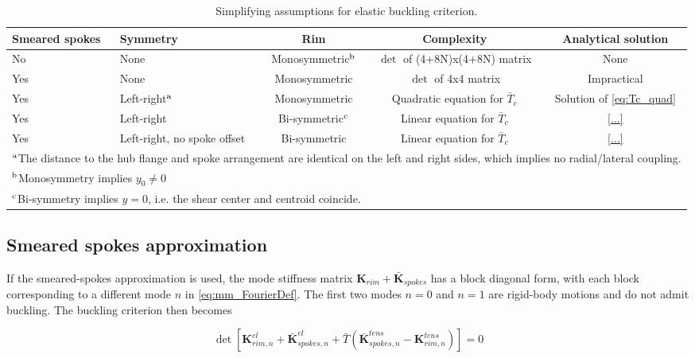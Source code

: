 \documentclass[\rootdir/thesis.tex]{subfiles}
\begin{document}
\begin{table}[h]
\caption{Simplifying assumptions for elastic buckling criterion.}
\label{tab:BucklingSolutions}
\begin{tabularx}{\textwidth}{p{1.2cm}Xccc}
\toprule
\centering Smeared spokes & \centering Symmetry & Rim & Complexity & Analytical solution\\
\midrule
\centering No  & \centering None & Monosymmetric$^{\rm b}$ & $\det$ of (4+8N)x(4+8N) matrix & None\\
\centering Yes & \centering None & Monosymmetric & $\det$ of 4x4 matrix & Impractical\\
\centering Yes & \centering Left-right$^{\rm a}$& Monosymmetric& Quadratic equation for $\bar{T}_c$ & Solution of \eqref{eq:Tc_quad}\\
\centering Yes & \centering Left-right& Bi-symmetric$^{\rm c}$ & Linear equation for $\bar{T}_c$ & \eqref{...}\\
\centering Yes & \centering Left-right, no spoke offset & Bi-symmetric & Linear equation for $\bar{T}_c$ & \eqref{...}\\
\bottomrule
\multicolumn{5}{p{\textwidth}}{
$^{\rm a}$The distance to the hub flange and spoke arrangement are identical on the left and right sides, which implies no radial/lateral coupling.
}\\
\multicolumn{5}{p{\textwidth}}{
$^{\rm b}$Monosymmetry implies $y_0\neq 0$
}\\
\multicolumn{5}{p{\textwidth}}{
$^{\rm c}$Bi-symmetry implies $y=0$, i.e. the shear center and centroid coincide.
}\\
\bottomrule
\end{tabularx}
\end{table}

\subsection{Smeared spokes approximation}

If the smeared-spokes approximation is used, the mode stiffness matrix $\mathbf{K}_{rim} + \mathbf{\bar{K}}_{spokes}$ has a block diagonal form, with each block corresponding to a different mode $n$ in \eqref{eq:mm_FourierDef}. The first two modes $n=0$ and $n=1$ are rigid-body motions and do not admit buckling. The buckling criterion then becomes

\begin{equation}
\label{eq:Tc_crit_smeared}
\det{\left[\mathbf{K}_{rim,n}^{el} + \mathbf{\bar{K}}_{spokes,n}^{el} + \bar{T}(\mathbf{\bar{K}}_{spokes,n}^{tens} - \mathbf{K}_{rim,n}^{tens})\right]} = 0
\end{equation}
\end{document}
